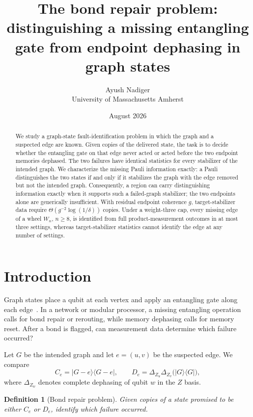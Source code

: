 \documentclass[11pt]{article}
\title{The bond repair problem:\\distinguishing a missing entangling gate from endpoint dephasing in graph states}
\author{Ayush Nadiger\\\small University of Massachusetts Amherst}
\date{August 2026}
\newtheorem{definition}[theorem]{Definition}
\theoremstyle{remark}
\begin{document}
\maketitle

\begin{abstract}
We study a graph-state fault-identification problem in which the graph and a suspected edge are known.  Given copies of the delivered state, the task is to decide whether the entangling gate on that edge never acted or acted before the two endpoint memories dephased.  The two failures have identical statistics for every stabilizer of the intended graph.  We characterize the missing Pauli information exactly: a Pauli distinguishes the two states if and only if it stabilizes the graph with the edge removed but not the intended graph.  Consequently, a region can carry distinguishing information exactly when it supports such a failed-graph stabilizer; the two endpoints alone are generically insufficient.  With residual endpoint coherence \(g\), target-stabilizer data require \(\Theta(g^{-2}\log(1/\delta))\) copies.  Under a weight-three cap, every missing edge of a wheel \(W_n\), \(n\ge8\), is identified from full product-measurement outcomes in at most three settings, whereas target-stabilizer statistics cannot identify the edge at any number of settings.
\end{abstract}

\section{Introduction}

Graph states place a qubit at each vertex and apply an entangling gate along each edge~\cite{Hein06}.  In a network or modular processor, a missing entangling operation calls for bond repair or rerouting, while memory dephasing calls for memory reset.  After a bond is flagged, can measurement data determine which failure occurred?

Let \(G\) be the intended graph and let \(e=(u,v)\) be the suspected edge.  We compare
\[
  C_e = |G-e\rangle\langle G-e|,
  \qquad
  D_e = \Delta_{Z_u}\Delta_{Z_v}\bigl(|G\rangle\langle G|\bigr),
\]
where \(\Delta_{Z_w}\) denotes complete dephasing of qubit \(w\) in the \(Z\) basis.

\begin{definition}[Bond repair problem]\label{def:bondrepair}
Given copies of a state promised to be either \(C_e\) or \(D_e\), identify which failure occurred.
\end{definition}
\end{document}
